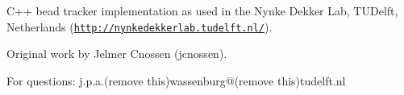 C++ bead tracker implementation as used in the Nynke Dekker Lab, T\+U\+Delft, Netherlands (\href{http://nynkedekkerlab.tudelft.nl/}{\tt http\+://nynkedekkerlab.\+tudelft.\+nl/}).

Original work by Jelmer Cnossen (jcnossen).

For questions\+: j.\+p.\+a.(remove this)wassenburg@(remove this)tudelft.\+nl 